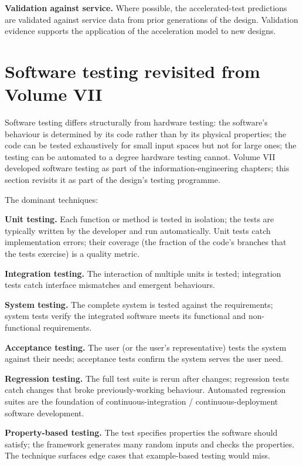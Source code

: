 \textbf{Validation against service.} Where possible, the accelerated-test predictions are validated against service data from prior generations of the design. Validation evidence supports the application of the acceleration model to new designs.

\section{Software testing revisited from Volume VII}

Software testing differs structurally from hardware testing: the software's behaviour is determined by its code rather than by its physical properties; the code can be tested exhaustively for small input spaces but not for large ones; the testing can be automated to a degree hardware testing cannot. Volume VII developed software testing as part of the information-engineering chapters; this section revisits it as part of the design's testing programme.

The dominant techniques:

\textbf{Unit testing.} Each function or method is tested in isolation; the tests are typically written by the developer and run automatically. Unit tests catch implementation errors; their coverage (the fraction of the code's branches that the tests exercise) is a quality metric.

\textbf{Integration testing.} The interaction of multiple units is tested; integration tests catch interface mismatches and emergent behaviours.

\textbf{System testing.} The complete system is tested against the requirements; system tests verify the integrated software meets its functional and non-functional requirements.

\textbf{Acceptance testing.} The user (or the user's representative) tests the system against their needs; acceptance tests confirm the system serves the user need.

\textbf{Regression testing.} The full test suite is rerun after changes; regression tests catch changes that broke previously-working behaviour. Automated regression suites are the foundation of continuous-integration / continuous-deployment software development.

\textbf{Property-based testing.} The test specifies properties the software should satisfy; the framework generates many random inputs and checks the properties. The technique surfaces edge cases that example-based testing would miss.

